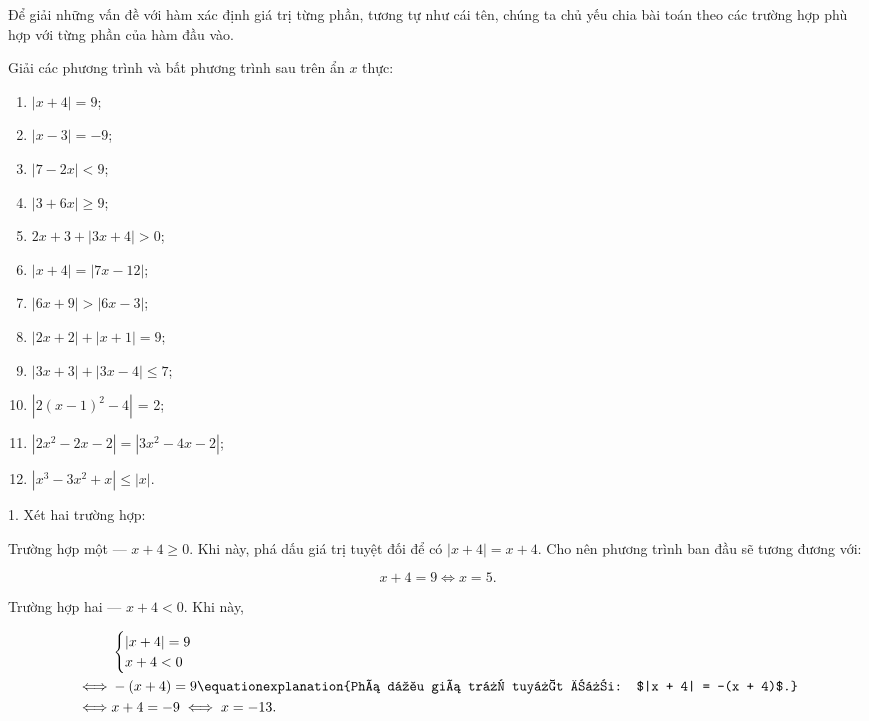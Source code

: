 Để giải những vấn đề với hàm xác định giá trị từng phần, tương tự như cái tên, chúng ta chủ yếu chia bài toán theo các trường hợp phù hợp với từng phần của hàm đầu vào.

\exercise Giải các phương trình và bất phương trình sau trên ẩn $x$ thực:

\begin{multicols}{2}
   \begin{enumerate}
      \item $|x + 4| = 9$;
      \item $|x - 3| = -9$;
      \item $|7 - 2x| < 9$;
      \item $|3 + 6x| \geq 9$;
      \item $2x + 3 + |3x + 4| > 0$;
      \item $|x + 4| = |7x - 12|$;
      \item $|6x + 9| > |6x - 3|$;
      \item $\left|2x + 2\right| + |x + 1| = 9$;
      \item $|3x + 3| + |3x - 4| \leq 7$;
      \item $\left|2(x - 1)^2 - 4\right|$ = 2;
      \item $\left|2x^2 - 2x - 2\right| = \left|3x^2 - 4x - 2\right|$;
      \item $\left|x^3 - 3x^2 + x\right| \leq |x|$.
   \end{enumerate}
\end{multicols}

\solution

1. Xét hai trường hợp:

\textcolor{colorEmphasisCyan}{Trường hợp một --- $x + 4 \geq 0$}. Khi này, phá dấu giá trị tuyệt đối để có $|x + 4| = x + 4$. Cho nên phương trình ban đầu sẽ tương đương với:

\begin{equation*}
   x + 4 = 9 \iff x = 5.
\end{equation*}

\textcolor{colorEmphasis}{Trường hợp hai --- $x + 4 < 0$}. Khi này,

\begin{align*}
   &\begin{cases}
      |x + 4| = 9 \\
      x + 4 < 0
   \end{cases} \\
   \iff &-(x + 4) = 9 \equationexplanation{Phá dấu giá trị tuyệt đối: $|x + 4| = -(x + 4)$.}\\
   \iff &x + 4 = -9 \iff x = -13.
\end{align*}

